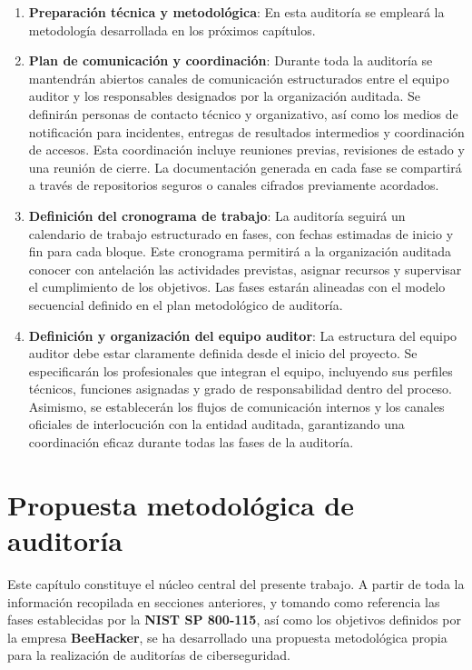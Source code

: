 \documentclass[a4paper, 11pt]{article}
\begin{document}
\begin{enumerate}
\item \textbf{Preparación técnica y metodológica}: En esta auditoría se empleará la metodología desarrollada en los próximos capítulos.

\item \textbf{Plan de comunicación y coordinación}: Durante toda la auditoría se mantendrán abiertos canales de comunicación estructurados entre el equipo auditor y los responsables designados por la organización auditada. Se definirán personas de contacto técnico y organizativo, así como los medios de notificación para incidentes, entregas de resultados intermedios y coordinación de accesos. Esta coordinación incluye reuniones previas, revisiones de estado y una reunión de cierre. La documentación generada en cada fase se compartirá a través de repositorios seguros o canales cifrados previamente acordados.

\item \textbf{Definición del cronograma de trabajo}: La auditoría seguirá un calendario de trabajo estructurado en fases, con fechas estimadas de inicio y fin para cada bloque. Este cronograma permitirá a la organización auditada conocer con antelación las actividades previstas, asignar recursos y supervisar el cumplimiento de los objetivos. Las fases estarán alineadas con el modelo secuencial definido en el plan metodológico de auditoría.

\item \textbf{Definición y organización del equipo auditor}: La estructura del equipo auditor debe estar claramente definida desde el inicio del proyecto. Se especificarán los profesionales que integran el equipo, incluyendo sus perfiles técnicos, funciones asignadas y grado de responsabilidad dentro del proceso. Asimismo, se establecerán los flujos de comunicación internos y los canales oficiales de interlocución con la entidad auditada, garantizando una coordinación eficaz durante todas las fases de la auditoría.
\end{enumerate}

\clearpage
\thispagestyle{nohead}



\section{Propuesta metodológica de auditoría}

Este capítulo constituye el núcleo central del presente trabajo. A partir de toda la información recopilada en secciones anteriores, y tomando como referencia las fases establecidas por la \textbf{NIST SP 800-115}, así como los objetivos definidos por la empresa \textbf{BeeHacker}, se ha desarrollado una propuesta metodológica propia para la realización de auditorías de ciberseguridad.
\end{document}
